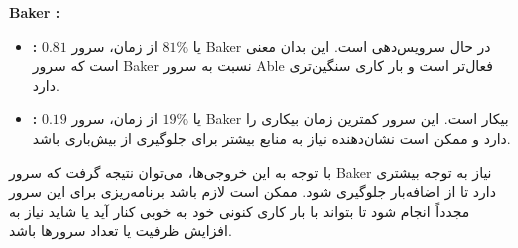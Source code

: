 \textbf{Baker :}
\begin{itemize}
	\item \textbf{ :} \(0.81\) یا \(81\%\) از زمان، سرور Baker در حال سرویس‌دهی است. این بدان معنی است که سرور Baker نسبت به سرور Able فعال‌تر است و بار کاری سنگین‌تری دارد.
	\item \textbf{ :} \(0.19\) یا \(19\%\) از زمان، سرور Baker بیکار است. این سرور کمترین زمان بیکاری را دارد و ممکن است نشان‌دهنده نیاز به منابع بیشتر برای جلوگیری از بیش‌باری باشد.
\end{itemize}

با توجه به این خروجی‌ها، می‌توان نتیجه گرفت که سرور Baker نیاز به توجه بیشتری دارد تا از اضافه‌بار جلوگیری شود. ممکن است لازم باشد برنامه‌ریزی برای این سرور مجدداً انجام شود تا بتواند با بار کاری کنونی خود به خوبی کنار آید یا شاید نیاز به افزایش ظرفیت یا تعداد سرورها باشد.
